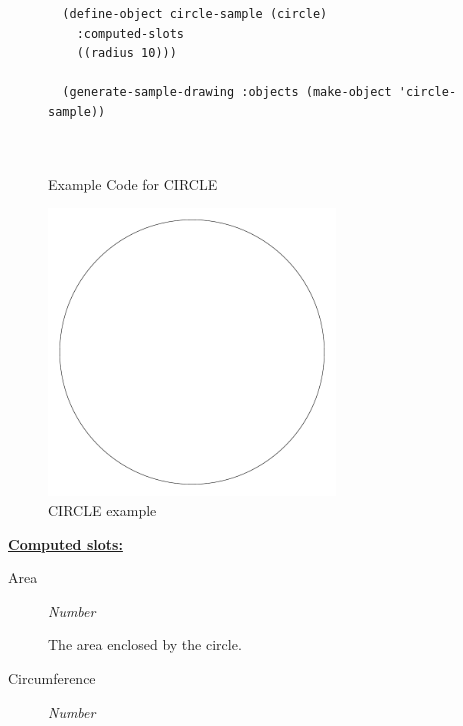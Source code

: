 \documentclass [11pt]{book}
\begin{document}
\begin{itemize}
\begin{figure}
\begin{lrbox}{\boxedverb}
\begin{minipage}{\linewidth}
{\begin{verbatim}
  (define-object circle-sample (circle)
    :computed-slots
    ((radius 10)))

  (generate-sample-drawing :objects (make-object 'circle-sample))

                  

\end{verbatim}}
\end{minipage}
\end{lrbox}
\fbox{\usebox{\boxedverb}}

\caption{Example Code for CIRCLE}

\label{fig:example-code-CIRCLE}

\end{figure}

\begin{figure}
\begin{center}
\includegraphics[width=3in,height=3in]{../images/example-CIRCLE.pdf}
\end{center}

\caption{CIRCLE example}

\label{fig:CIRCLE}

\end{figure}





\textbf{
\underline{Computed slots:}}

\begin{description}

\item [Area]
\emph{Number}

 The area enclosed by the circle.




\item [Circumference]
\emph{Number}


\end{description}
\end{itemize}
\end{document}
